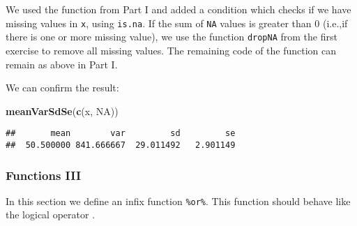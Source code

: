 \documentclass[11,]{article}
\newenvironment{Shaded}{\begin{snugshade}}{\end{snugshade}}
\newcommand{\KeywordTok}[1]{\textcolor[rgb]{0.13,0.29,0.53}{\textbf{{#1}}}}
\newcommand{\DataTypeTok}[1]{\textcolor[rgb]{0.13,0.29,0.53}{{#1}}}
\newcommand{\DecValTok}[1]{\textcolor[rgb]{0.00,0.00,0.81}{{#1}}}
\newcommand{\StringTok}[1]{\textcolor[rgb]{0.31,0.60,0.02}{{#1}}}
\newcommand{\CommentTok}[1]{\textcolor[rgb]{0.56,0.35,0.01}{\textit{{#1}}}}
\newcommand{\OtherTok}[1]{\textcolor[rgb]{0.56,0.35,0.01}{{#1}}}
\newcommand{\NormalTok}[1]{{#1}}
\begin{document}
We used the function from Part I and added a condition which checks if
we have missing values in \texttt{x}, using \texttt{is.na}. If the sum
of \texttt{NA} values is greater than \(0\) (i.e.,if there is one or
more missing value), we use the function \texttt{dropNA} from the first
exercise to remove all missing values. The remaining code of the
function can remain as above in Part I.

We can confirm the result:

\begin{Shaded}
\begin{Highlighting}[]
\KeywordTok{meanVarSdSe}\NormalTok{(}\KeywordTok{c}\NormalTok{(x, }\OtherTok{NA}\NormalTok{))}
\end{Highlighting}
\end{Shaded}

\begin{verbatim}
##       mean        var         sd         se 
##  50.500000 841.666667  29.011492   2.901149
\end{verbatim}

\subsubsection{Functions III}\label{functions-iii}

In this section we define an infix function \texttt{\%or\%}. This
function should behave like the logical operator \texttt{\textbar{}}.

\begin{Shaded}
\end{Shaded}
\end{document}
